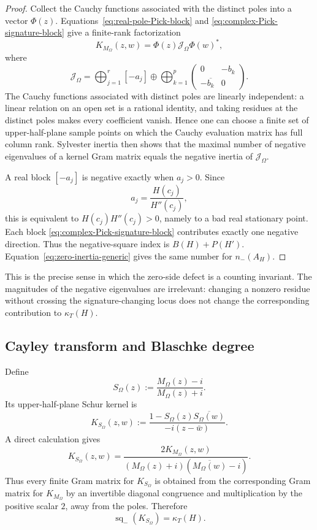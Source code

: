 \begin{proof}
Collect the Cauchy functions associated with the distinct poles into a vector
$\Phi(z)$.  Equations~\eqref{eq:real-pole-Pick-block} and
\eqref{eq:complex-Pick-signature-block} give a finite-rank factorization
\[
K_{M_\Omega}(z,w)
=
\Phi(z)\mathcal J_\Omega\Phi(w)^*,
\]
where
\[
\mathcal J_\Omega
=
\bigoplus_{j=1}^{r}[-a_j]
\oplus
\bigoplus_{k=1}^{p}
\begin{pmatrix}
0&-b_k\\
-\overline{b_k}&0
\end{pmatrix}.
\]
The Cauchy functions associated with distinct poles are linearly independent:
a linear relation on an open set is a rational identity, and taking residues
at the distinct poles makes every coefficient vanish.  Hence one can choose a
finite set of upper-half-plane sample points on which the Cauchy evaluation
matrix has full column rank.  Sylvester inertia then shows that the maximal
number of negative eigenvalues of a kernel Gram matrix equals the negative
inertia of $\mathcal J_\Omega$.

A real block $[-a_j]$ is negative exactly when $a_j>0$.  Since
\[
a_j=\frac{H(c_j)}{H''(c_j)},
\]
this is equivalent to $H(c_j)H''(c_j)>0$, namely to a bad real stationary
point.  Each block \eqref{eq:complex-Pick-signature-block} contributes exactly
one negative direction.  Thus the negative-square index is
$B(H)+P(H')$.  Equation~\eqref{eq:zero-inertia-generic} gives the same number
for $n_-(A_H)$.
\end{proof}

This is the precise sense in which the zero-side defect is a counting
invariant.  The magnitudes of the negative eigenvalues are irrelevant: changing
a nonzero residue without crossing the signature-changing locus does not change
the corresponding contribution to $\kappa_T(H)$.

\subsection{Cayley transform and Blaschke degree}

Define
\begin{equation}
S_\Omega(z)
:=
\frac{M_\Omega(z)-i}{M_\Omega(z)+i}.
\label{eq:SOmega-Cayley}
\end{equation}
Its upper-half-plane Schur kernel is
\[
K_{S_\Omega}(z,w)
:=
\frac{1-S_\Omega(z)\overline{S_\Omega(w)}}
{-i(z-\bar w)}.
\]
A direct calculation gives
\begin{equation}
\boxed{
K_{S_\Omega}(z,w)
=
\frac{
2K_{M_\Omega}(z,w)
}{
(M_\Omega(z)+i)
(\overline{M_\Omega(w)}-i)
}.
}
\label{eq:Cayley-kernel-congruence}
\end{equation}
Thus every finite Gram matrix for $K_{S_\Omega}$ is obtained from the
corresponding Gram matrix for $K_{M_\Omega}$ by an invertible diagonal
congruence and multiplication by the positive scalar $2$, away from the poles.
Therefore
\begin{equation}
\operatorname{sq}_-(K_{S_\Omega})
=
\kappa_T(H).
\label{eq:Cayley-same-negative-index}
\end{equation}

